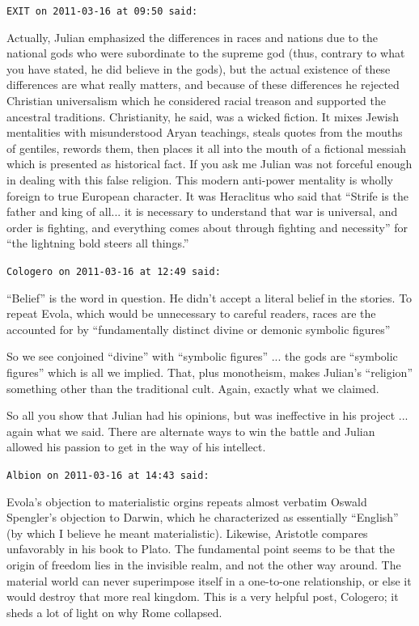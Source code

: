 \begin{footnotesize}
\begin{sffamily}
\texttt{EXIT on 2011-03-16 at 09:50 said:}

Actually, Julian emphasized the differences in races and nations due to the national gods who were subordinate to the supreme god (thus, contrary to what you have stated, he did believe in the gods), but the actual existence of these differences are what really matters, and because of these differences he rejected Christian universalism which he considered racial treason and supported the ancestral traditions. Christianity, he said, was a wicked fiction. It mixes Jewish mentalities with misunderstood Aryan teachings, steals quotes from the mouths of gentiles, rewords them, then places it all into the mouth of a fictional messiah which is presented as historical fact. If you ask me Julian was not forceful enough in dealing with this false religion. This modern anti-power mentality is wholly foreign to true European character. It was Heraclitus who said that ``Strife is the father and king of all... it is necessary to understand that war is universal, and order is fighting, and everything comes about through fighting and necessity'' for ``the lightning bold steers all things.''

\hfill

\texttt{Cologero on 2011-03-16 at 12:49 said:}

``Belief'' is the word in question. He didn't accept a literal belief in the stories. To repeat Evola, which would be unnecessary to careful readers, races are the accounted for by ``fundamentally distinct divine or demonic symbolic figures''

So we see conjoined ``divine'' with ``symbolic figures'' ... the gods are ``symbolic figures'' which is all we implied. That, plus monotheism, makes Julian's ``religion'' something other than the traditional cult. Again, exactly what we claimed.

So all you show that Julian had his opinions, but was ineffective in his project ... again what we said. There are alternate ways to win the battle and Julian allowed his passion to get in the way of his intellect.

\hfill

\texttt{Albion on 2011-03-16 at 14:43 said:}

Evola's objection to materialistic orgins repeats almost verbatim Oswald Spengler's objection to Darwin, which he characterized as essentially ``English'' (by which I believe he meant materialistic). Likewise, Aristotle compares unfavorably in his book to Plato. The fundamental point seems to be that the origin of freedom lies in the invisible realm, and not the other way around. The material world can never superimpose itself in a one-to-one relationship, or else it would destroy that more real kingdom. This is a very helpful post, Cologero; it sheds a lot of light on why Rome collapsed.


\end{sffamily}
\end{footnotesize}
